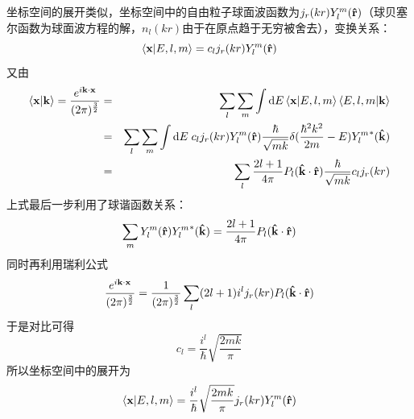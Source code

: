 \documentclass[hyperref]{ctexart}
\begin{document}
坐标空间的展开类似，坐标空间中的自由粒子球面波函数为$j_r(kr)Y_l^m(\vu{r})$（球贝塞尔函数为球面波方程的解，$n_l(kr)$由于在原点趋于无穷被舍去），变换关系：
\begin{equation}\label{xelm}
  \braket{\vb{x}}{E,l,m}=c_lj_r(kr)Y_l^m(\vu{r})
\end{equation}
又由
\begin{eqnarray}
  \braket{\vb{x}}{\vb{k}}=\frac{e^{i\vb{k}\cdot\vb{x}}}{(2\pi)^{\frac{3}{2}}} &=& \sum_l\sum_m\int\dd E \braket{\vb{x}}{E,l,m}\braket{E,l,m}{\vb{k}} \\
   &=& \sum_l\sum_m\int\dd E \;c_lj_r(kr)Y_l^m(\vu{r})\frac{\hbar}{\sqrt{mk}}\delta(\frac{\hbar^2k^2}{2m}-E){Y_l^m}^*(\vu{k}) \\
   \label{ek}&=& \sum_l\frac{2l+1}{4\pi}P_l(\vu{k}\cdot\vu{r})\frac{\hbar}{\sqrt{mk}}c_lj_r(kr)
\end{eqnarray}
上式最后一步利用了球谐函数关系：
\begin{equation}\label{YYy}
  \sum_mY_l^m(\vu{r}){Y_l^m}^*(\vu{k})=\frac{2l+1}{4\pi}P_l(\vu{k}\cdot\vu{r})
\end{equation}
同时再利用瑞利公式
\begin{equation}\label{Rayleigh}
  \frac{e^{i\vb{k}\cdot\vb{x}}}{(2\pi)^{\frac{3}{2}}}=\frac{1}{(2\pi)^{\frac{3}{2}}}\sum_l(2l+1)i^lj_r(kr)P_l(\vu{k}\cdot\vu{r})
\end{equation}
于是对比可得
\begin{equation}
c_l=\frac{i^l}{\hbar}\sqrt{\frac{2mk}{\pi}}
\end{equation}
所以坐标空间中的展开为
\begin{equation}\label{xelm2}
  \braket{\vb{x}}{E,l,m}=\frac{i^l}{\hbar}\sqrt{\frac{2mk}{\pi}}j_r(kr)Y_l^m(\vu{r})
\end{equation}
\end{document}
